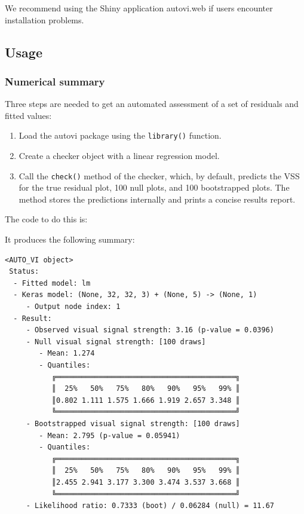 \documentclass[
doublespace,
  times]{anzsauth}
\newenvironment{Shaded}{\begin{snugshade}}{\end{snugshade}}
\newcommand{\AttributeTok}[1]{\textcolor[rgb]{0.40,0.45,0.13}{#1}}
\newcommand{\FunctionTok}[1]{\textcolor[rgb]{0.28,0.35,0.67}{#1}}
\newcommand{\NormalTok}[1]{\textcolor[rgb]{0.00,0.23,0.31}{#1}}
\newcommand{\OtherTok}[1]{\textcolor[rgb]{0.00,0.23,0.31}{#1}}
\newcommand{\SpecialCharTok}[1]{\textcolor[rgb]{0.37,0.37,0.37}{#1}}
\providecommand{\tightlist}{%
  \setlength{\itemsep}{0pt}\setlength{\parskip}{0pt}}\usepackage{longtable,booktabs,array}
\begin{document}
We recommend using the \textsf{Shiny} application \textsf{autovi.web} if
users encounter installation problems.

\subsection{Usage}\label{sec-autovi-usage}

\subsubsection{Numerical summary}\label{sec-autovi-numerical}

Three steps are needed to get an automated assessment of a set of
residuals and fitted values:

\begin{enumerate}
\def\labelenumi{\arabic{enumi}.}
\tightlist
\item
  Load the \textsf{autovi} package using the \texttt{library()}
  function.
\item
  Create a checker object with a linear regression model.
\item
  Call the \texttt{check()} method of the checker, which, by default,
  predicts the VSS for the true residual plot, 100 null plots, and 100
  bootstrapped plots. The method stores the predictions internally and
  prints a concise results report.
\end{enumerate}

The code to do this is:

\begin{Shaded}
\end{Shaded}

It produces the following summary:

\begin{verbatim}
<AUTO_VI object>
 Status:
  - Fitted model: lm
  - Keras model: (None, 32, 32, 3) + (None, 5) -> (None, 1)
     - Output node index: 1
  - Result:
     - Observed visual signal strength: 3.16 (p-value = 0.0396)
     - Null visual signal strength: [100 draws]
        - Mean: 1.274
        - Quantiles: 
           ╔══════════════════════════════════════════╗
           ║  25%   50%   75%   80%   90%   95%   99% ║
           ║0.802 1.111 1.575 1.666 1.919 2.657 3.348 ║
           ╚══════════════════════════════════════════╝
     - Bootstrapped visual signal strength: [100 draws]
        - Mean: 2.795 (p-value = 0.05941)
        - Quantiles: 
           ╔══════════════════════════════════════════╗
           ║  25%   50%   75%   80%   90%   95%   99% ║
           ║2.455 2.941 3.177 3.300 3.474 3.537 3.668 ║
           ╚══════════════════════════════════════════╝
     - Likelihood ratio: 0.7333 (boot) / 0.06284 (null) = 11.67
\end{verbatim}
\end{document}
